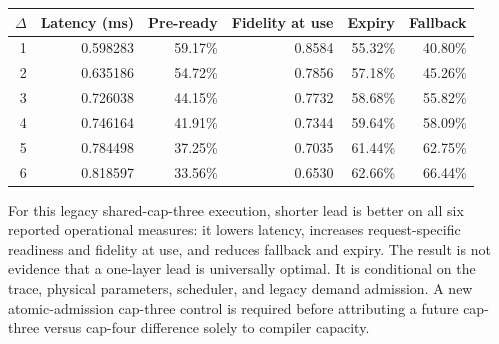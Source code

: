 \documentclass[11pt,a4paper]{report}
\begin{document}
\begin{center}
\begin{tabular}{rrrrrr}
\toprule
$\Delta$ & Latency (ms) & Pre-ready & Fidelity at use & Expiry & Fallback \\
\midrule
1 & 0.598283 & 59.17\% & 0.8584 & 55.32\% & 40.80\% \\
2 & 0.635186 & 54.72\% & 0.7856 & 57.18\% & 45.26\% \\
3 & 0.726038 & 44.15\% & 0.7732 & 58.68\% & 55.82\% \\
4 & 0.746164 & 41.91\% & 0.7344 & 59.64\% & 58.09\% \\
5 & 0.784498 & 37.25\% & 0.7035 & 61.44\% & 62.75\% \\
6 & 0.818597 & 33.56\% & 0.6530 & 62.66\% & 66.44\% \\
\bottomrule
\end{tabular}
\end{center}

For this legacy shared-cap-three execution, shorter lead is better on all six
reported operational measures: it lowers latency, increases request-specific
readiness and fidelity at use, and reduces fallback and expiry. The result is
not evidence that a one-layer lead is universally optimal. It is conditional on
the trace, physical parameters, scheduler, and legacy demand admission. A
new atomic-admission cap-three control is required before attributing a future
cap-three versus cap-four difference solely to compiler capacity.
\end{document}
